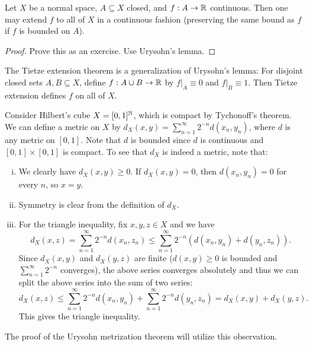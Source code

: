 \begin{theorem}
  Let $X$ be a normal space, $A \subseteq X$
  closed, and $f : A \to \mathbb{R}$ continuous. Then
  one may extend $f$ to all of $X$ in a continuous
  fashion (preserving the same bound as $f$ if $f$ is
  bounded on $A$).
\end{theorem}

\begin{proof}
  Prove this as an exercise. Use Urysohn's lemma.
\end{proof}

\begin{remark}
  The Tietze extension theorem is a generalization
  of Urysohn's lemma: For disjoint closed sets
  $A, B \subseteq X$, define $f : A \cup B \to \mathbb{R}$
  by $f|_A \equiv 0$ and $f|_B \equiv 1$.
  Then Tietze extension defines $f$ on all of $X$.
\end{remark}

\begin{example}
  Consider Hilbert's cube $X = [0, 1]^{\mathbb{N}}$, which
  is compact by Tychonoff's theorem. We can define
  a metric on $X$ by
  $d_X(x, y) = \sum_{n = 1}^\infty 2^{-n} d(x_n, y_n)$,
  where $d$ is any metric on $[0, 1]$. Note that $d$
  is bounded since $d$ is continuous and
  $[0, 1] \times [0, 1]$ is compact. To
  see that $d_X$ is indeed a metric, note that:
  \begin{enumerate}[(i)]
    \item We clearly have $d_X(x, y) \ge 0$.
      If $d_X(x, y) = 0$, then $d(x_n, y_n) = 0$
      for every $n$, so $x = y$.
    \item Symmetry is clear from the definition of
      $d_X$.
    \item For the triangle inequality, fix $x, y, z \in X$ and we have
      \[
        d_X(x, z) = \sum_{n = 1}^\infty 2^{-n} d(x_n, z_n)
        \le \sum_{n = 1}^\infty 2^{-n} (d(x_n, y_n) + d(y_n, z_n)).
      \]
      Since $d_X(x, y)$ and $d_X(y, z)$ are finite ($d(x, y) \ge 0$ is bounded and $\sum_{n = 1}^\infty 2^{-n}$ converges),
      the above series converges absolutely and thus
      we can split the above series into the sum of
      two series:
      \[
        d_X(x, z) \le \sum_{n = 1}^\infty 2^{-n} d(x_n, y_n) + \sum_{n = 1}^\infty 2^{-n} d(y_n, z_n)
        = d_X(x, y) + d_X(y, z).
      \]
      This gives the triangle inequality.
  \end{enumerate}
  The proof of the Urysohn metrization theorem
  will utilize this observation.
\end{example}
